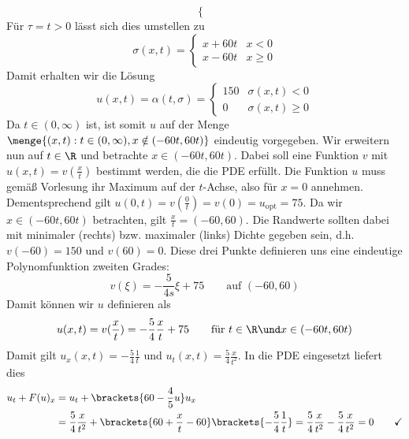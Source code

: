 \begin{exercisePage}
\begin{enumerate}[label=(zu \alph*)]
\begin{equation*}
\begin{cases}
		\end{cases}
	\end{equation*}
	Für $\tau =  t > 0$ lässt sich dies umstellen zu
	\begin{equation*}
		\sigma(x,t) = 
		\begin{cases}
			x + 60 t & x < 0 \\
			x - 60 t & x \ge 0
		\end{cases}
	\end{equation*}
	Damit erhalten wir die Lösung 
	\begin{equation*}
		u(x,t) = \alpha(t, \sigma) = 
		\begin{cases}
			150 & \sigma(x,t) < 0 \\
			0   & \sigma(x,t) \ge 0
		\end{cases}
	\end{equation*}
	Da $t \in (0, \infty)$ ist, ist somit $u$ auf der Menge $\menge{(x,t) : t \in (0,\infty), x \notin (-60t, 60t)}$ eindeutig vorgegeben. Wir erweitern nun auf $t \in \R$ und betrachte $x \in (-60t, 60t)$. Dabei soll eine Funktion $v$ mit $u(x,t) = v(\frac{x}{t})$ bestimmt werden, die die PDE erfüllt. Die Funktion $u$ muss gemäß Vorlesung ihr Maximum auf der $t$-Achse, also für $x=0$ annehmen. Dementsprechend gilt $u(0,t) = v(\frac{0}{t}) = v(0) = u_\text{opt} = 75$. Da wir $x \in (-60t, 60t)$ betrachten, gilt $\frac{x}{t} = (-60,60)$. Die Randwerte sollten dabei mit minimaler (rechts) bzw. maximaler (links) Dichte gegeben sein, d.h. $v(-60) = 150$ und $v(60) = 0$. Diese drei Punkte definieren uns eine eindeutige Polynomfunktion zweiten Grades:
	\begin{equation*}
		v(\xi) = -\frac{5}{4s} \xi + 75 \qquad \text{auf } (-60, 60)
	\end{equation*}
	Damit können wir $u$ definieren als
	\begin{equation*}
		u(x,t) = v(\frac{x}{t}) = -\frac{5}{4} \frac{x}{t} + 75 \qquad \text{für } t \in \R \und x \in (-60t, 60t)
	\end{equation*}
	Damit gilt $u_x(x,t) = -\frac{5}{4} \frac{1}{t}$ und $u_t(x,t) = \frac{5}{4} \frac{x}{t^2}$. In die PDE eingesetzt liefert dies
	\begin{equation*}
		\begin{aligned}
			u_t + F(u)_x &= u_t + \brackets{60 - \frac{4}{5} u} u_x \\
			&= \frac{5}{4} \frac{x}{t^2} + \brackets{60 + \frac{x}{t} - 60} \brackets{-\frac{5}{4} \frac{1}{t}} 
			= \frac{5}{4} \frac{x}{t^2} -\frac{5}{4} \frac{x}{t^2} 
			= 0 \qquad \checkmark

\end{aligned}
\end{equation*}
\end{enumerate}
\end{exercisePage}
